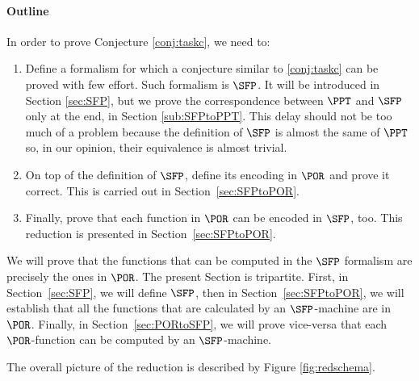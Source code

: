 \begin{conditional}{\extendedorsup}

   \paragraph{Outline}

   In order to prove Conjecture \ref{conj:taskc}, we need to:

   \begin{enumerate}
     \item Define a formalism for which a conjecture similar to \ref{conj:taskc}
     can be proved with few effort. Such formalism is $\SFP$.
     It will be introduced in Section \ref{sec:SFP}, but we  prove the
     correspondence between $\PPT$ and $\SFP$ only at the end,
     in Section \ref{sub:SFPtoPPT}. This delay should not be too much of a problem
     because the definition of $\SFP$ is almost the same of $\PPT$ so,
     in our opinion, their equivalence is almost trivial.
     \item On top of the definition of $\SFP$, define its encoding in $\POR$
     and prove it correct. This is carried out in Section~\ref{sec:SFPtoPOR}.
     \item Finally, prove that each function in $\POR$ can be encoded in $\SFP$,
     too. This reduction is presented in Section~\ref{sec:SFPtoPOR}.
   \end{enumerate}
\end{conditional}
\begin{conditional}{\notappendix}

  We will prove that the functions
  that can be computed in the $\SFP$
  formalism are precisely the ones
  in $\POR$.
  The present Section is tripartite.
  First, in Section~\ref{sec:SFP}, we will define $\SFP$,
  then in Section~\ref{sec:SFPtoPOR},
  we will establish that all the functions that
  are calculated by an $\SFP$-machine are in
  $\POR$.
  Finally, in Section~\ref{sec:PORtoSFP},
  we will prove vice-versa that each $\POR$-function
  can be computed by an
  $\SFP$-machine.
\end{conditional}

The overall picture of the reduction is described by Figure \ref{fig:redschema}.

